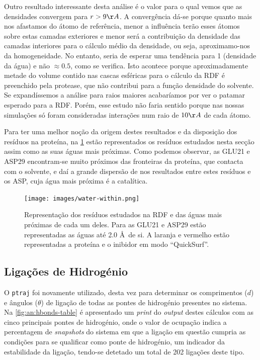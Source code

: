 \documentclass[12pt,a4paper]{article}
\begin{document}
	Outro resultado interessante desta análise é o valor para o qual vemos que as densidades convergem para $r>9\AA$. A convergência dá-se porque quanto mais nos afastamos do átomo de referência, menor a influência terão esses átomos sobre estas camadas exteriores e menor será a contribuição da densidade das camadas interiores para o cálculo médio da densidade, ou seja, aproximamo-nos da homogeneidade. No entanto, seria de esperar uma tendência para 1 (densidade da água) e não $\approx0.5$, como se verifica. Isto acontece porque aproximadamente metade do volume contido nas cascas esféricas para o cálculo da RDF é preenchido pela protease, que não contribui para a função densidade do solvente. Se expandíssemos a análise para raios maiores acabaríamos por ver o patamar esperado para a RDF. Porém, esse estudo não faria sentido porque nas nossas simulações só foram consideradas interações num raio de $10 \AA$ de cada átomo.
	
	Para ter uma melhor noção da origem destes resultados e da disposição dos resíduos na proteína, na \cref{fig:an:water-within} estão representados os resíduos estudados nesta secção assim como as suas águas mais próximas. Como podemos observar, as GLU21 e ASP29 encontram-se muito próximos das fronteiras da proteína, que contacta com o solvente, e daí a grande dispersão de nos resultados entre estes resíduos e os ASP, cuja água mais próxima é a catalítica.
	
	\begin{figure}[h]
		\centering
		\texttt{[image: images/water-within.png]}
		\caption{Representação dos resíduos estudados na RDF e das águas mais próximas de cada um deles. Para as GLU21 e ASP29 estão representadas as águas até 2.0 \AA\ de si. A laranja e vermelho estão representadas a proteína e o inibidor em modo ``QuickSurf''.}
		\label{fig:an:water-within}
	\end{figure}
	
\subsection{Ligações de Hidrogénio}
	O \verb|ptraj| foi novamente utilizado, desta vez para determinar os comprimentos ($d$) e ângulos ($\theta$) de ligação de todas as pontes de hidrogénio presentes no sistema. Na \cref{fig:an:hbonds-table} é apresentado um \textit{print} do \textit{output} destes cálculos com as cinco principais pontes de hidrogénio, onde o valor de ocupação indica a percentagem de \textit{snapshots} do sistema em que a ligação em questão cumpria as condições para se qualificar como ponte de hidrogénio, um indicador da estabilidade da ligação, tendo-se detetado um total de 202 ligações deste tipo.
	
\end{document}
